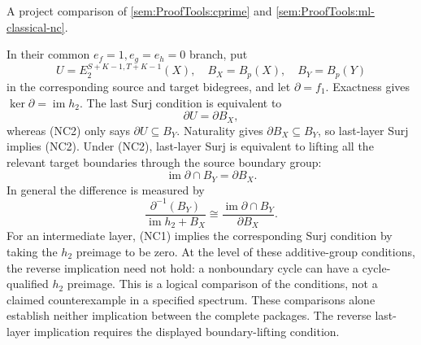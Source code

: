\begin{proposition}
\label{sem:ProofTools:ml-last-layer}
A project comparison of \ref{sem:ProofTools:cprime} and
\ref{sem:ProofTools:ml-classical-nc}.\par
In their common $e_f=1,e_g=e_h=0$ branch, put
\[
 U=E_2^{S+K-1,T+K-1}(X),\quad B_X=B_p(X),\quad B_Y=B_p(Y)
\]
in the corresponding source and target bidegrees, and let $\partial=f_1$.
Exactness gives $\ker\partial=\operatorname{im}h_2$.
The last Surj condition is equivalent to
\[
 \partial U=\partial B_X,
\]
whereas (NC2) only says $\partial U\subseteq B_Y$.
Naturality gives $\partial B_X\subseteq B_Y$, so last-layer Surj implies
(NC2). Under (NC2), last-layer Surj is equivalent to lifting all the
relevant target boundaries through the source boundary group:
\[
 \operatorname{im}\partial\cap B_Y=\partial B_X.
\]
In general the difference is measured by
\[
 \frac{\partial^{-1}(B_Y)}{\operatorname{im}h_2+B_X}
 \cong\frac{\operatorname{im}\partial\cap B_Y}{\partial B_X}.
\]
For an intermediate layer, (NC1) implies the corresponding Surj
condition by taking the $h_2$ preimage to be zero. At the level of these
additive-group conditions, the reverse implication need not hold: a
nonboundary cycle can have a cycle-qualified $h_2$ preimage. This is a
logical comparison of the conditions, not a claimed counterexample in a
specified spectrum. These comparisons alone establish neither implication
between the complete packages. The reverse last-layer implication requires
the displayed boundary-lifting condition.
\end{proposition}
